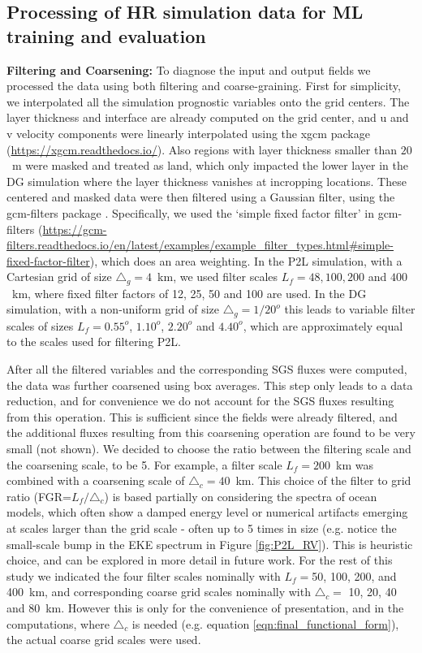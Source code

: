 \documentclass[draft]{agujournal2019}
\begin{document}
\subsection{Processing of HR simulation data for ML training and evaluation}
\label{sec:data/filter_coarsen}
\textbf{Filtering and Coarsening:}
To diagnose the input and output fields we processed the data using both filtering and coarse-graining. First for simplicity, we interpolated all the simulation prognostic variables onto the grid centers. 
The layer thickness and interface are already computed on the grid center, and u and v velocity components were linearly interpolated using the xgcm package (\url{https://xgcm.readthedocs.io/}). Also regions with layer thickness smaller than $20$~m were masked and treated as land, which only impacted the lower layer in the DG simulation where the layer thickness vanishes at incropping locations. These centered and masked data were then filtered using a Gaussian filter, using the gcm-filters package \cite{loose2022gcm}.  Specifically, we used the `simple fixed factor filter' in gcm-filters (\url{https://gcm-filters.readthedocs.io/en/latest/examples/example_filter_types.html#simple-fixed-factor-filter}), which does an area weighting. In the P2L simulation, with a Cartesian grid of size $\triangle_g = 4$~km, we used filter scales $L_f=48, 100, 200$ and $400$~km, where fixed filter factors of 12, 25, 50 and 100 are used. In the DG simulation, with a non-uniform grid of size $\triangle_g =1/20^o$ this leads to variable filter scales of sizes $L_f =0.55^o$, $1.10^o$, $2.20^o$ and $4.40^o$, which are approximately equal to the scales used for filtering P2L. 


After all the filtered variables and the corresponding SGS fluxes were computed, the data was further coarsened using box averages. This step only leads to a data reduction, and for convenience we do not account for the SGS fluxes resulting from this operation. This is sufficient since the fields were already filtered, and the additional fluxes resulting from this coarsening operation are found to be very small (not shown). We decided to choose the ratio between the filtering scale and the coarsening scale, to be 5. For example, a filter scale $L_f =200$~km was combined with a coarsening scale of $\triangle_c =40$~km. This choice of the filter to grid ratio (FGR=$L_f/\triangle_c$) is based partially on considering the spectra of ocean models, which often show a damped energy level or numerical artifacts emerging at scales larger than the grid scale - often up to 5 times in size (e.g. notice the small-scale bump in the EKE spectrum in Figure \ref{fig:P2L_RV}). This is heuristic choice, and can be explored in more detail in future work. For the rest of this study we indicated the four filter scales nominally with $L_f=$50, 100, 200, and 400~km, and corresponding coarse grid scales nominally with $\triangle_c=$ 10, 20, 40 and 80~km. However this is only for the convenience of presentation, and in the computations, where $\triangle_c$ is needed (e.g. equation \ref{eqn:final_functional_form}), the actual coarse grid scales were used. 
\end{document}
